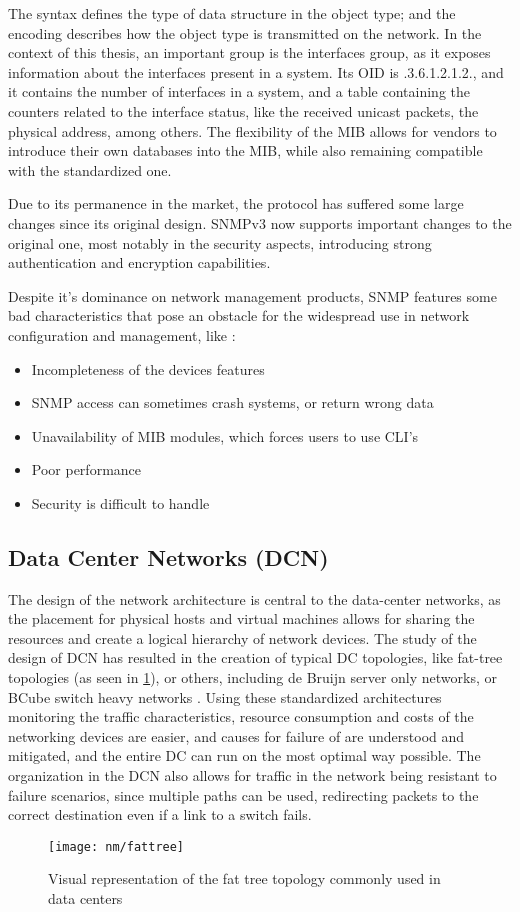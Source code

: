 \par The syntax defines the type of data structure in the object type; and the encoding describes how the object type is transmitted on the network. In the context
of this thesis, an important group is the interfaces group, as it exposes information about the interfaces present in a system. Its OID is .3.6.1.2.1.2., 
and it contains the number of interfaces in a system, and a table containing the counters related to the interface status, like the received unicast packets, the 
physical address, among others. The flexibility of the MIB allows for vendors to introduce their own databases into the MIB, while also remaining compatible 
with the standardized one.

\par Due to its permanence in the market, the protocol has suffered some large changes since its original design. SNMPv3 now supports important changes to the
original one, most notably in the security aspects, introducing strong authentication and encryption capabilities.

\par Despite it's dominance on network management products, SNMP features some bad characteristics that pose an obstacle for the widespread use in network
configuration and management, like \cite{schonwalder_overview_2003}: 

\begin {itemize}
    \item Incompleteness of the devices features
    \item SNMP access can sometimes crash systems, or return wrong data
    \item Unavailability of MIB modules, which forces users to use CLI's
    \item Poor performance 
    \item Security is difficult to handle
\end {itemize}

\subsection {Data Center Networks (DCN)}

\par The design of the network architecture is central to the data-center networks, as the placement for physical hosts and virtual machines allows for sharing the 
resources and create a logical hierarchy of network devices. The study of the design of DCN has resulted in the creation of typical DC topologies, like fat-tree
topologies (as seen in \ref{fig:fattree}), or others, including de Bruijn server only networks, or BCube switch heavy networks \cite{popa_cost_2010}. Using these
standardized architectures monitoring the traffic characteristics, resource consumption and costs of the networking devices are easier, and causes for failure of
are understood and mitigated, and the entire DC can run on the most optimal way possible. The organization in the DCN also allows for traffic in the network being 
resistant to failure scenarios, since multiple paths can be used, redirecting packets to the correct destination even if a link to a switch fails.

\begin{figure} [H]
    \centering
    \texttt{[image: nm/fattree]}
    \caption{Visual representation of the fat tree topology commonly used in data centers}
    \label{fig:fattree}
\end{figure}

